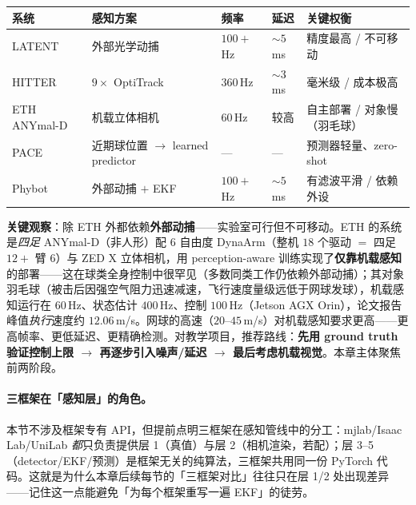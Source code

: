 \begin{center}
\small
\begin{tabular}{@{}lllll@{}}
\toprule
系统 & 感知方案 & 频率 & 延迟 & 关键权衡 \\
\midrule
LATENT\cite{tennis_latent2026} & 外部光学动捕 & $100+$\,Hz & $\sim5$\,ms & 精度最高 / 不可移动 \\
HITTER\cite{tennis_hitter2025} & $9\times$ OptiTrack & $360$\,Hz & $\sim3$\,ms & 毫米级 / 成本极高 \\
ETH ANYmal-D\cite{tennis_eth2025badminton} & 机载立体相机 & $60$\,Hz & 较高 & 自主部署 / 对象慢（羽毛球） \\
PACE\cite{tennis_pace2025} & 近期球位置 $\to$ learned predictor & — & — & 预测器轻量、zero-shot \\
Phybot\cite{tennis_phybot2025} & 外部动捕 $+$ EKF & $100+$\,Hz & $\sim5$\,ms & 有滤波平滑 / 依赖外设 \\
\bottomrule
\end{tabular}
\end{center}


\textbf{关键观察}：除 ETH 外都依赖\textbf{外部动捕}——实验室可行但不可移动。ETH 的系统是\emph{四足} ANYmal-D（非人形）配 $6$ 自由度 DynaArm（整机 $18$ 个驱动 $=$ 四足 $12+$ 臂 $6$）与 ZED X 立体相机，用 perception-aware 训练实现了\textbf{仅靠机载感知}的部署——这在球类全身控制中很罕见（多数同类工作仍依赖外部动捕）；其对象羽毛球（被击后因强空气阻力迅速减速，飞行速度量级远低于网球发球），机载感知运行在 $60$\,Hz、状态估计 $400$\,Hz、控制 $100$\,Hz（Jetson AGX Orin），论文报告峰值\emph{执行}速度约 $12.06$\,m/s。网球的高速（$20$--$45$\,m/s）对机载感知要求更高——更高帧率、更低延迟、更精确检测。对教学项目，推荐路线：\textbf{先用 ground truth 验证控制上限 $\to$ 再逐步引入噪声/延迟 $\to$ 最后考虑机载视觉}。本章主体聚焦前两阶段。

\paragraph{三框架在「感知层」的角色。}本节不涉及框架专有 API，但提前点明三框架在感知管线中的分工：mjlab/Isaac Lab/UniLab \emph{都}只负责提供层 1（真值）与层 2（相机渲染，若配）；层 3--5（detector/EKF/预测）是框架无关的纯算法，三框架共用同一份 PyTorch 代码。这就是为什么本章后续每节的「三框架对比」往往只在层 1/2 处出现差异——记住这一点能避免「为每个框架重写一遍 EKF」的徒劳。

